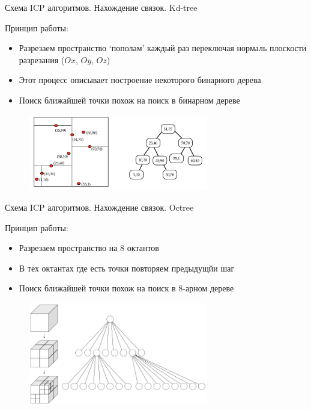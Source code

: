 \documentclass[6pt,pdf,utf8,russian]{beamer}
\begin{document}
\begin{frame}[fragile]{Схема ICP алгоритмов. Нахождение связок. Kd-tree}

    \begin{block}{}
        Принцип работы:
        \begin{itemize}
            \item Разрезаем пространство `пополам' каждый раз переключая нормаль плоскости разрезания ($Ox$, $Oy$, $Oz$)
            \item Этот процесс описывает построение некоторого бинарного дерева
            \item Поиск ближайшей точки похож на поиск в бинарном дереве
        \end{itemize}
        \begin{figure}
            \includegraphics[width=0.7\textwidth]{images/kd_tree.jpg}
        \end{figure}
    \end{block}

\end{frame}

\begin{frame}[fragile]{Схема ICP алгоритмов. Нахождение связок. Octree}

    \begin{block}{}
        Принцип работы:
        \begin{itemize}
            \item Разрезаем пространство на 8 октантов
            \item В тех октантах где есть точки повторяем предыдущйи шаг
            \item Поиск ближайшей точки похож на поиск в 8-арном дереве
        \end{itemize}
        \begin{figure}
            \includegraphics[width=0.7\textwidth]{images/octree.png}
        \end{figure}
    \end{block}

\end{frame}
\end{document}
